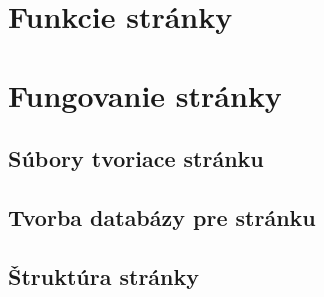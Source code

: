 \section{Funkcie stránky}

\section{Fungovanie stránky}

\subsection{Súbory tvoriace stránku}

\subsection{Tvorba databázy pre stránku}

\subsection{Štruktúra stránky}